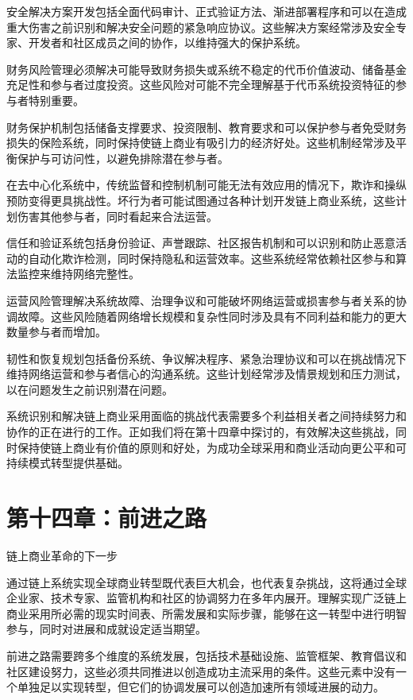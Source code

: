 \documentclass[
  Letterpaper,
]{scrbook}
\begin{document}
安全解决方案开发包括全面代码审计、正式验证方法、渐进部署程序和可以在造成重大伤害之前识别和解决安全问题的紧急响应协议。这些解决方案经常涉及安全专家、开发者和社区成员之间的协作，以维持强大的保护系统。

财务风险管理必须解决可能导致财务损失或系统不稳定的代币价值波动、储备基金充足性和参与者过度投资。这些风险对可能不完全理解基于代币系统投资特征的参与者特别重要。

财务保护机制包括储备支撑要求、投资限制、教育要求和可以保护参与者免受财务损失的保险系统，同时保持使链上商业有吸引力的经济好处。这些机制经常涉及平衡保护与可访问性，以避免排除潜在参与者。

在去中心化系统中，传统监督和控制机制可能无法有效应用的情况下，欺诈和操纵预防变得更具挑战性。坏行为者可能试图通过各种计划开发链上商业系统，这些计划伤害其他参与者，同时看起来合法运营。

信任和验证系统包括身份验证、声誉跟踪、社区报告机制和可以识别和防止恶意活动的自动化欺诈检测，同时保持隐私和运营效率。这些系统经常依赖社区参与和算法监控来维持网络完整性。

运营风险管理解决系统故障、治理争议和可能破坏网络运营或损害参与者关系的协调故障。这些风险随着网络增长规模和复杂性同时涉及具有不同利益和能力的更大数量参与者而增加。

韧性和恢复规划包括备份系统、争议解决程序、紧急治理协议和可以在挑战情况下维持网络运营和参与者信心的沟通系统。这些计划经常涉及情景规划和压力测试，以在问题发生之前识别潜在问题。

系统识别和解决链上商业采用面临的挑战代表需要多个利益相关者之间持续努力和协作的正在进行的工作。正如我们将在第十四章中探讨的，有效解决这些挑战，同时保持使链上商业有价值的原则和好处，为成功全球采用和商业活动向更公平和可持续模式转型提供基础。

\chapter{第十四章：前进之路}\label{sec-path-forward}

链上商业革命的下一步

通过链上系统实现全球商业转型既代表巨大机会，也代表复杂挑战，这将通过全球企业家、技术专家、监管机构和社区的协调努力在多年内展开。理解实现广泛链上商业采用所必需的现实时间表、所需发展和实际步骤，能够在这一转型中进行明智参与，同时对进展和成就设定适当期望。

前进之路需要跨多个维度的系统发展，包括技术基础设施、监管框架、教育倡议和社区建设努力，这些必须共同推进以创造成功主流采用的条件。这些元素中没有一个单独足以实现转型，但它们的协调发展可以创造加速所有领域进展的动力。
\end{document}
